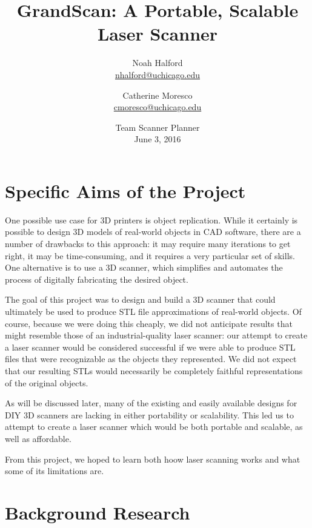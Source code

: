 \documentclass[12pt, letterpaper]{article}
\title{GrandScan: A Portable, Scalable Laser Scanner}
\author{Noah Halford\\
    \href{mailto:nhalford@uchicago.edu}{nhalford@uchicago.edu}
        \and
        Catherine Moresco\\
        \href{mailto:cmoresco@uchicago.edu}{cmoresco@uchicago.edu}}
\date{{\Large Team Scanner Planner}\\[5mm] June 3, 2016}
\begin{document}
\maketitle

\section{Specific Aims of the Project} \label{aims}

One possible use case for 3D printers is object replication. While it certainly is possible
to design 3D models of real-world objects in CAD software, there are a number of drawbacks
to this approach: it may require many iterations to get right, it may be time-consuming, and
it requires a very particular set of skills. One alternative is to use a 3D scanner, which
simplifies and automates the process of digitally fabricating the desired object.

The goal of this project was to design and build a 3D scanner that could ultimately be used
to produce STL file approximations of real-world objects. Of course, because we were doing
this cheaply, we did not anticipate results that might resemble those of an industrial-quality
laser scanner: our attempt to create a laser scanner would be considered successful if we were
able to produce STL files that were recognizable as the objects they represented. We did not
expect that our resulting STLs would necessarily be completely faithful representations of the
original objects.

As will be discussed later, many of the existing and easily available designs for DIY
3D scanners are lacking in either portability or scalability. This led us
to attempt to create a laser scanner which would be both portable and scalable, as well
as affordable.

From this project, we hoped to learn both hoow laser scanning works and what some of its
limitations are.

\section{Background Research} \label{background}
\end{document}
